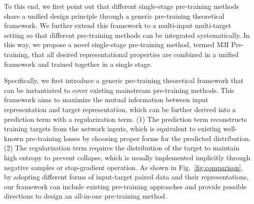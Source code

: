 \documentclass[10pt,twocolumn,letterpaper]{article}
\def\name{M3I Pre-training}
\begin{document}
To this end, we first point out that different single-stage pre-training methods share a unified design principle through a generic pre-training theoretical framework. We further extend this framework to a multi-input multi-target setting so that different pre-training methods can be integrated systematically. In this way, we propose a novel single-stage pre-training method, termed \name{}, that all desired representational properties are combined in a unified framework and trained together in a single stage.



Specifically, we first introduce a generic pre-training theoretical framework that can be instantiated to cover existing mainstream pre-training methods. 
This framework aims to maximize the mutual information between input representation
and target representation,
which can be further derived into a prediction term with a regularization term. 
(1) The prediction term reconstructs training targets 
from the network inputs, which is equivalent to existing well-known pre-training losses by choosing proper forms for the predicted distribution.
(2) The regularization term requires the distribution of the target 
to maintain high entropy to prevent collapse, which is usually implemented implicitly through negative samples or stop-gradient operation. As shown in Fig.~\ref{fig:comparison}, by adopting different forms of input-target paired data
and their representations,
our framework can include existing pre-training approaches and provide possible directions to design an all-in-one pre-training method.
\end{document}
